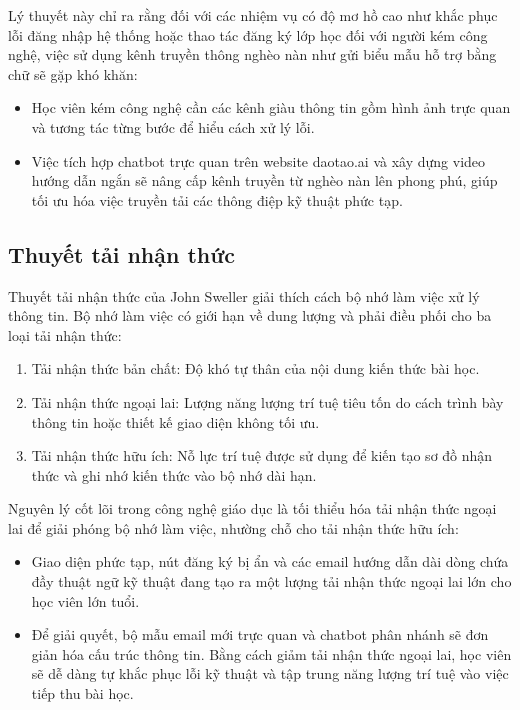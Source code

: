 Lý thuyết này chỉ ra rằng đối với các nhiệm vụ có độ mơ hồ cao như khắc phục lỗi đăng nhập hệ thống hoặc thao tác đăng ký lớp học đối với người kém công nghệ, việc sử dụng kênh truyền thông nghèo nàn như gửi biểu mẫu hỗ trợ bằng chữ sẽ gặp khó khăn:
\begin{itemize}
    \item Học viên kém công nghệ cần các kênh giàu thông tin gồm hình ảnh trực quan và tương tác từng bước để hiểu cách xử lý lỗi.
    \item Việc tích hợp chatbot trực quan trên website daotao.ai và xây dựng video hướng dẫn ngắn sẽ nâng cấp kênh truyền từ nghèo nàn lên phong phú, giúp tối ưu hóa việc truyền tải các thông điệp kỹ thuật phức tạp.
\end{itemize}

\subsection{Thuyết tải nhận thức}

Thuyết tải nhận thức của John Sweller \parencite{sweller1988} giải thích cách bộ nhớ làm việc xử lý thông tin. Bộ nhớ làm việc có giới hạn về dung lượng và phải điều phối cho ba loại tải nhận thức:
\begin{enumerate}
    \item Tải nhận thức bản chất: Độ khó tự thân của nội dung kiến thức bài học.
    \item Tải nhận thức ngoại lai: Lượng năng lượng trí tuệ tiêu tốn do cách trình bày thông tin hoặc thiết kế giao diện không tối ưu.
    \item Tải nhận thức hữu ích: Nỗ lực trí tuệ được sử dụng để kiến tạo sơ đồ nhận thức và ghi nhớ kiến thức vào bộ nhớ dài hạn.
\end{enumerate}

Nguyên lý cốt lõi trong công nghệ giáo dục là tối thiểu hóa tải nhận thức ngoại lai để giải phóng bộ nhớ làm việc, nhường chỗ cho tải nhận thức hữu ích:
\begin{itemize}
    \item Giao diện phức tạp, nút đăng ký bị ẩn và các email hướng dẫn dài dòng chứa đầy thuật ngữ kỹ thuật đang tạo ra một lượng tải nhận thức ngoại lai lớn cho học viên lớn tuổi.
    \item Để giải quyết, bộ mẫu email mới trực quan và chatbot phân nhánh sẽ đơn giản hóa cấu trúc thông tin. Bằng cách giảm tải nhận thức ngoại lai, học viên sẽ dễ dàng tự khắc phục lỗi kỹ thuật và tập trung năng lượng trí tuệ vào việc tiếp thu bài học.
\end{itemize}
